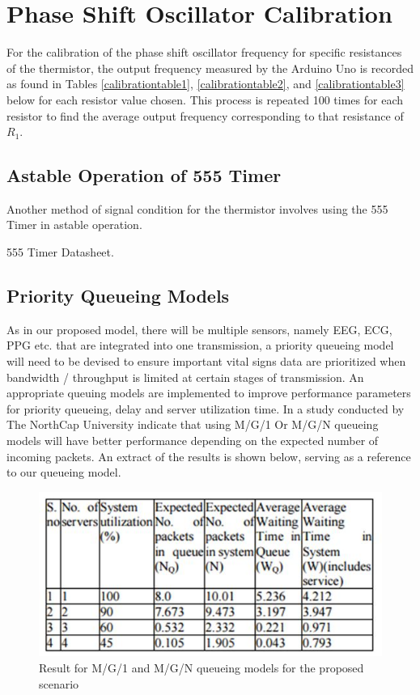 \section{Phase Shift Oscillator Calibration}
\label{psocalibration}

For the calibration of the phase shift oscillator frequency for specific resistances of the thermistor, the output frequency measured by the Arduino Uno is recorded as found in Tables \ref{calibrationtable1}, \ref{calibrationtable2}, and \ref{calibrationtable3} below for each resistor value chosen. This process is repeated 100 times for each resistor to find the average output frequency corresponding to that resistance of $R_1$.  \\

\subsection{Astable Operation of 555 Timer}

Another method of signal condition for the thermistor involves using the 555 Timer in astable operation. 

555 Timer Datasheet. 

\subsection{Priority Queueing Models}

As in our proposed model, there will be multiple sensors, namely EEG, ECG, PPG etc. that are integrated into one transmission, a priority queueing model will need to be devised to ensure important vital signs data are prioritized when bandwidth / throughput is limited at certain stages of transmission. An appropriate queuing models are implemented to improve performance parameters for priority queueing, delay and server utilization time. In a study conducted by The NorthCap University \cite{lit4} indicate that using M/G/1 Or M/G/N queueing models will have better performance depending on the expected number of incoming packets. An extract of the results is shown below, serving as a reference to our queueing model. 

\begin{figure}[H]
	\centering
	\includegraphics[width=0.5\linewidth]{lit3.jpg}
	\caption{Result for M/G/1 and M/G/N queueing models for the proposed scenario \cite{lit4}}
	\label{literaturereview3}
\end{figure}



